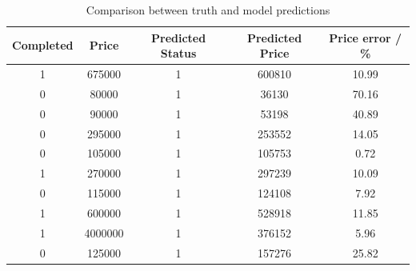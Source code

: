 \documentclass[12pt,twoside]{report}
\begin{document}
\begin{table}[!htbp]
	\centering
	\caption{Comparison between truth and model predictions}
	\label{first_model_predictions}
	\begin{tabular}{| c | c | c | c | c |}
		\hline
		Completed & Price & Predicted Status & Predicted Price & Price error  / \%\\ 
		\hline
		1 & 675000 & 1 & 600810 & 10.99 \\
		\hline
		0 & 80000 & 1 & 36130 & 70.16 \\
		\hline
		0 & 90000 & 1 & 53198 & 40.89  \\
		\hline
		0 & 295000 & 1 & 253552 & 14.05  \\
		\hline
		0 & 105000 & 1 & 105753 & 0.72  \\ 
		\hline
		1 & 270000 & 1 & 297239 & 10.09  \\
		\hline
		0 & 115000 & 1 & 124108 & 7.92  \\
		\hline
		1 & 600000 & 1 & 528918 & 11.85  \\
		\hline
		1 & 4000000 & 1 & 376152 & 5.96  \\
		\hline
		0 & 125000 & 1 & 157276 & 25.82  \\
		\hline
	\end{tabular}
\end{table}
\end{document}
